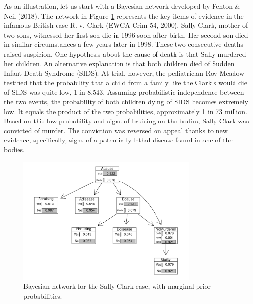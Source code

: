 \documentclass[
  letterpaper,
  DIV=11,
  numbers=noendperiod]{scrartcl}
\begin{document}
As an illustration, let us start with a Bayesian network developed by
Fenton \& Neil (2018).
The
network in Figure \ref{fig-scbnplot} represents the key items of
evidence in the infamous British case R. v. Clark (EWCA Crim 54, 2000).
Sally Clark, mother of two sons, witnessed her first son die in 1996
soon after birth. Her second son died in similar circumstances a few
years later in 1998. These two consecutive deaths raised suspicion. One
hypothesis about the cause of death is that Sally murdered her children.
An alternative explanation is that both children died of Sudden Infant
Death Syndrome (SIDS). At trial, however, the pediatrician Roy Meadow
testified that the probability that a child from a family like the
Clark's would die of SIDS was quite low, 1 in 8,543. Assuming
probabilistic independence between the two events, the probability of
both children dying of SIDS becomes extremely low. It equals the product
of the two probabilities, approximately 1 in 73 million. Based on this
low probability and signs of bruising on the bodies, Sally Clark was
convicted of murder. The conviction was reversed on appeal thanks to new
evidence, specifically, signs of a potentially lethal disease found in
one of the bodies.

\begin{figure}[H]

{\centering \includegraphics[width=0.8\textwidth,height=\textheight]{imp_philosophical_files/figure-pdf/fig-scbnplot-1.pdf}

}

\caption{\label{fig-scbnplot}Bayesian network for the Sally Clark case,
with marginal prior probabilities.}

\end{figure}
\end{document}
